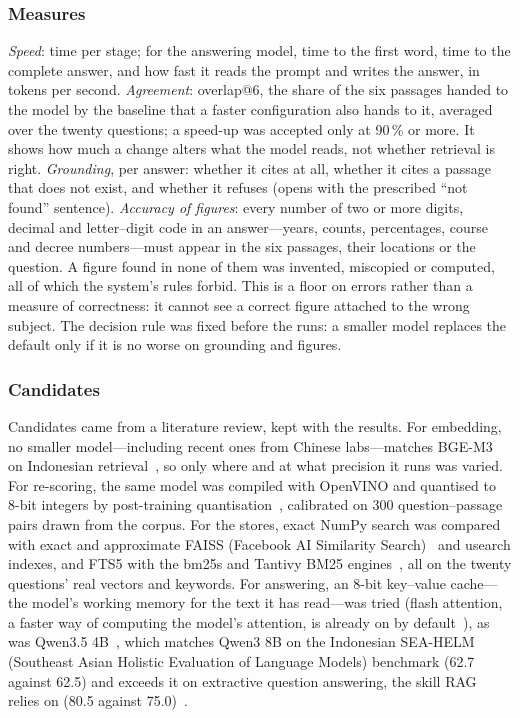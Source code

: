 \documentclass[conference]{IEEEtran}
\begin{document}
\subsubsection{Measures}
\emph{Speed}: time per stage; for the answering model, time to the first word,
time to the complete answer, and how fast it reads the prompt and writes the
answer, in tokens per second. \emph{Agreement}: overlap@6, the share of the six
passages handed to the model by the baseline that a faster configuration also
hands to it, averaged over the twenty questions; a speed-up was accepted only
at 90\,\% or more. It shows how much a change alters what the model reads,
not whether retrieval is right. \emph{Grounding}, per answer: whether it cites
at all, whether it cites a passage that does not exist, and whether it refuses
(opens with the prescribed ``not found'' sentence). \emph{Accuracy of
figures}: every number of two or more digits, decimal and letter--digit code
in an answer---years, counts, percentages, course and decree numbers---must
appear in the six passages, their locations or the question. A figure found
in none of them was invented, miscopied or computed, all of which the
system's rules forbid. This is a floor on errors rather than a measure of
correctness: it cannot see a correct figure attached to the wrong subject.
The decision rule was fixed before the runs: a smaller model replaces the
default only if it is no worse on grounding and figures.

\subsubsection{Candidates}
Candidates came from a literature review, kept with the results. For
embedding, no smaller model---including recent ones from Chinese
labs---matches BGE-M3 on Indonesian retrieval~\cite{bge}, so only where and
at what precision it runs was varied. For re-scoring, the same model was
compiled with OpenVINO and quantised to 8-bit integers by post-training
quantisation~\cite{nncf}, calibrated on 300 question--passage pairs drawn from
the corpus. For the stores, exact NumPy search was compared with exact and
approximate FAISS (Facebook AI Similarity Search)~\cite{faiss} and usearch
indexes, and FTS5 with the bm25s and Tantivy BM25 engines~\cite{bm25s}, all on
the twenty questions' real vectors and keywords. For answering, an 8-bit
key--value cache---the model's working memory for the text it has
read---was tried (flash attention, a faster way of computing the model's
attention, is already on by default~\cite{ollama}), as was
Qwen3.5 4B~\cite{qwen35}, which matches Qwen3 8B on the Indonesian SEA-HELM
(Southeast Asian Holistic Evaluation of Language Models)
benchmark (62.7 against 62.5) and exceeds it on extractive question answering,
the skill RAG relies on (80.5 against 75.0)~\cite{seahelm}.
\end{document}
